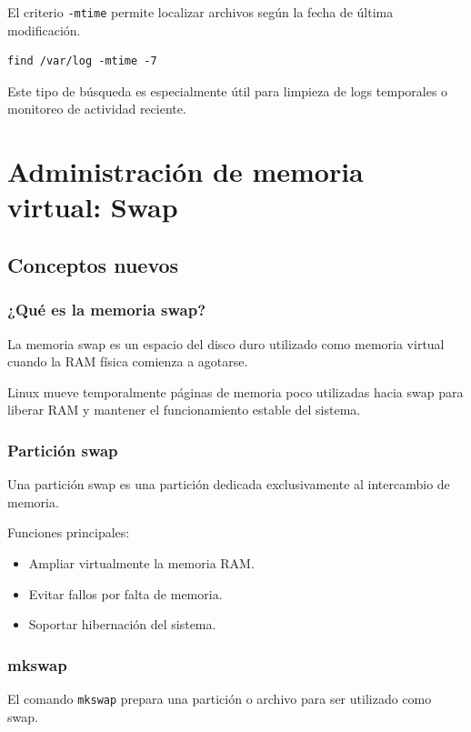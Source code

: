 \documentclass[11pt, letterpaper]{article}
\begin{document}
El criterio \texttt{-mtime} permite localizar archivos según la fecha de última modificación.

\begin{verbatim}
find /var/log -mtime -7
\end{verbatim}

Este tipo de búsqueda es especialmente útil para limpieza de logs temporales o monitoreo de actividad reciente.
\section{Administración de memoria virtual: Swap}
\label{sec:org8529b57}

\subsection{Conceptos nuevos}
\label{sec:org5540008}

\subsubsection{¿Qué es la memoria swap?}
\label{sec:org864acd5}

La memoria swap es un espacio del disco duro utilizado como memoria virtual cuando la RAM física comienza a agotarse.

Linux mueve temporalmente páginas de memoria poco utilizadas hacia swap para liberar RAM y mantener el funcionamiento estable del sistema.
\subsubsection{Partición swap}
\label{sec:org0b49e3d}

Una partición swap es una partición dedicada exclusivamente al intercambio de memoria.

Funciones principales:

\begin{itemize}
\item Ampliar virtualmente la memoria RAM.
\item Evitar fallos por falta de memoria.
\item Soportar hibernación del sistema.
\end{itemize}
\subsubsection{mkswap}
\label{sec:org80c724c}

El comando \texttt{mkswap} prepara una partición o archivo para ser utilizado como swap.
\end{document}
